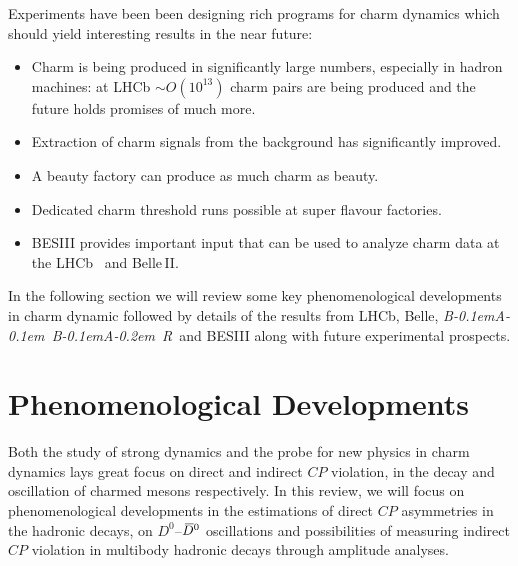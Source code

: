 \documentclass{PoS}
\def\babar{\mbox{\slshape B\kern-0.1em{\smaller A}\kern-0.1em
    B\kern-0.1em{\smaller A\kern-0.2em R}}}
\newcommand{\CP}{{\ensuremath{C\!P}}\xspace}
\newcommand{\Dz}{\ensuremath{D^0}\xspace}
\def\Dbar{{\kern 0.2em\overline{\kern -0.2em\ensuremath{D}}{}}\xspace}
\newcommand{\Dzb}{\ensuremath{\Dbar{}^0}\xspace}
\newcommand{\DzDzb}{\Dz--\Dzb}
\begin{document}
Experiments have been been designing rich programs for charm dynamics which should yield interesting results in the near future:
\begin{itemize}
\itemsep0em 
\item Charm is being produced in significantly large numbers, especially in hadron machines: at LHCb  $\sim O(10^{13})$ charm pairs are being produced and the future holds promises of much more.
\item Extraction of charm signals from the background has significantly improved.
\item A beauty factory can produce as much charm as beauty.
\item Dedicated charm threshold runs possible at super flavour factories.
\item BESIII provides important input that can be used to analyze charm data at the LHCb~\cite{Malde:2223391} and Belle\,II.
\end{itemize}

In the following section we will review some key phenomenological developments in charm dynamic followed by details of the results from LHCb, Belle, \babar\ and BESIII along with future experimental prospects.

\section{Phenomenological Developments}
\label{sec:pheno}

Both the study of strong dynamics and the probe for new physics in charm dynamics lays great focus on direct and indirect \CP violation,  in the decay and oscillation of charmed mesons respectively. In this review, we will focus on phenomenological developments in the estimations of direct \CP asymmetries in the hadronic decays, on \DzDzb oscillations and possibilities of measuring indirect \CP violation in multibody hadronic decays through amplitude analyses.

\end{document}
